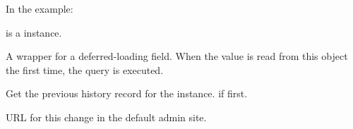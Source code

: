 \documentclass[letterpaper,10pt,english]{sphinxmanual}
\begin{document}
\begin{fulllineitems}
\begin{fulllineitems}
In the example:

\begin{sphinxVerbatim}[commandchars=\\\{\}]
 
       
\end{sphinxVerbatim}

 is a  instance.

\end{fulllineitems}


\begin{fulllineitems}
\label{\detokenize{modules/models:gestion.models.HistoricalKeg.pinte_id}}
A wrapper for a deferred-loading field. When the value is read from this
object the first time, the query is executed.

\end{fulllineitems}


\begin{fulllineitems}
\label{\detokenize{modules/models:gestion.models.HistoricalKeg.prev_record}}
Get the previous history record for the instance.  if first.

\end{fulllineitems}


\begin{fulllineitems}
\label{\detokenize{modules/models:gestion.models.HistoricalKeg.revert_url}}
URL for this change in the default admin site.

\end{fulllineitems}


\end{fulllineitems}
\end{document}
